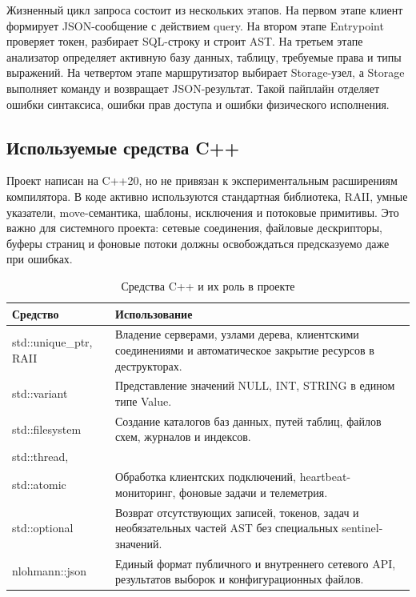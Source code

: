 \documentclass[a4paper,14pt]{extarticle}
\renewcommand{\texttt}[1]{\textrm{#1}}
\begin{document}
Жизненный цикл запроса состоит из нескольких этапов. На первом этапе клиент формирует JSON-сообщение с действием \texttt{query}. На втором этапе Entrypoint проверяет токен, разбирает SQL-строку и строит AST. На третьем этапе анализатор определяет активную базу данных, таблицу, требуемые права и типы выражений. На четвертом этапе маршрутизатор выбирает Storage-узел, а Storage выполняет команду и возвращает JSON-результат. Такой пайплайн отделяет ошибки синтаксиса, ошибки прав доступа и ошибки физического исполнения.

\subsection{Используемые средства C++}

Проект написан на C++20, но не привязан к экспериментальным расширениям компилятора. В коде активно используются стандартная библиотека, RAII, умные указатели, move-семантика, шаблоны, исключения и потоковые примитивы. Это важно для системного проекта: сетевые соединения, файловые дескрипторы, буферы страниц и фоновые потоки должны освобождаться предсказуемо даже при ошибках.

\begin{table}[H]
\caption{Средства C++ и их роль в проекте}
\centering
\small
\begin{tabularx}{\textwidth}{>{\raggedright\arraybackslash}p{}Y}
\toprule
Средство & Использование \\
\midrule
\texttt{std::unique\_ptr}, RAII & Владение серверами, узлами дерева, клиентскими соединениями и автоматическое закрытие ресурсов в деструкторах. \\
\texttt{std::variant} & Представление значений \texttt{NULL}, \texttt{INT}, \texttt{STRING} в едином типе \texttt{Value}. \\
\texttt{std::filesystem} & Создание каталогов баз данных, путей таблиц, файлов схем, журналов и индексов. \\
\texttt{std::thread},\\
\texttt{std::atomic} & Обработка клиентских подключений, heartbeat-мониторинг, фоновые задачи и телеметрия. \\
\texttt{std::optional} & Возврат отсутствующих записей, токенов, задач и необязательных частей AST без специальных sentinel-значений. \\
\texttt{nlohmann::json} & Единый формат публичного и внутреннего сетевого API, результатов выборок и конфигурационных файлов. \\
\bottomrule
\end{tabularx}
\end{table}
\end{document}

